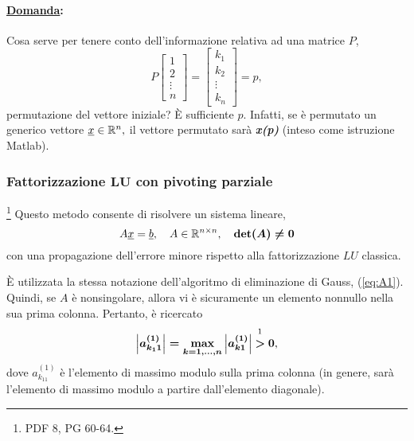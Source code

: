 \paragraph{\ul{Domanda}:}{Cosa serve per tenere conto dell'informazione relativa ad una matrice $P$,
\begin{equation*}
    P\begin{bmatrix}
        1\\
        2\\
        \vdots\\
        n
    \end{bmatrix} = 
    \begin{bmatrix}
        k_1\\
        k_2\\
        \vdots\\
        k_n
    \end{bmatrix} = p,
\end{equation*}
permutazione del vettore iniziale? È sufficiente $p$. Infatti, se è permutato un generico vettore $\uline x\in\mathbb R^n,$ il vettore permutato sarà \textbf{\textit{x(p)}} (inteso come istruzione Matlab).}

\subsubsection{Fattorizzazione \texorpdfstring{$\boldsymbol{LU}$}{LU} con pivoting parziale}\label{ssec:fattLUPivParz}\footnote{PDF 8, PG 60-64.}
Questo metodo consente di risolvere un sistema lineare,
\begin{equation*}
    A\uline x=\uline b, \quad A\in\mathbb R^{n \times n}, \quad \boldsymbol{\det(A)\neq 0}
\end{equation*}
con una propagazione dell'errore minore rispetto alla fattorizzazione $LU$ classica. %

È utilizzata la stessa notazione dell'algoritmo di eliminazione di Gauss, (\ref{eq:A1}). Quindi, se $A$ è \gls{nonsingolare}, allora vi è sicuramente un elemento nonnullo nella sua prima colonna. Pertanto, è ricercato
\begin{equation*}
    \boldsymbol{\left|a_{k_11}^{(1)}\right|=\underset{k=1,\hdots,n}{\max}\left|a_{k1}^{(1)}\right|}\overset{\footnotemark}{\boldsymbol >}\boldsymbol 0,
\end{equation*}
dove $a_{k_11}^{(1)}$ è l'elemento di massimo modulo sulla prima colonna (in genere, sarà l'elemento di massimo modulo a partire dall'elemento diagonale).

